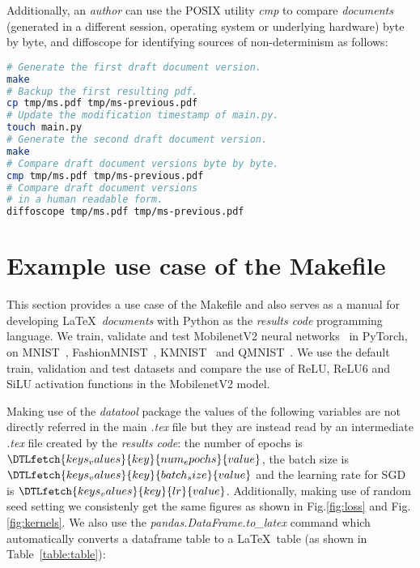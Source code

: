 \documentclass[journal]{IEEEtran}
\begin{document}
Additionally, an \textit{author} can use the POSIX utility \textit{cmp} to compare \textit{documents} (generated in a different session, operating system or underlying hardware) byte by byte, and diffoscope for identifying sources of non-determinism as follows:
\begin{lstlisting}[language=bash, style=lststyle, caption={Test draft document version reproducibility. This can also be used as a test script when pushing or pull requesting to a remote repository.}]
# Generate the first draft document version.
make
# Backup the first resulting pdf.
cp tmp/ms.pdf tmp/ms-previous.pdf
# Update the modification timestamp of main.py.
touch main.py
# Generate the second draft document version.
make
# Compare draft document versions byte by byte.
cmp tmp/ms.pdf tmp/ms-previous.pdf
# Compare draft document versions
# in a human readable form.
diffoscope tmp/ms.pdf tmp/ms-previous.pdf
\end{lstlisting}

\section{Example use case of the Makefile}
This section provides a use case of the Makefile and also serves as a manual for developing \LaTeX\ \textit{documents} with Python as the \textit{results code} programming language.
We train, validate and test MobilenetV2 neural networks~\cite{sandler2018mobilenetv2} in PyTorch, on MNIST~\cite{lecun2010mnist}, FashionMNIST~\cite{xiao2017fashion}, KMNIST~\cite{clanuwat2018deep} and QMNIST~\cite{yadav2019cold}.
We use the default train, validation and test datasets and compare the use of ReLU, ReLU6\cite{dahl2013improving} and SiLU\cite{elfwing2018sigmoid} activation functions in the MobilenetV2 model.

Making use of the \textit{datatool} package the values of the following variables are not directly referred in the main \textit{.tex} file but they are instead read by an intermediate \textit{.tex} file created by the \textit{results code}: the number of epochs is $\DTLfetch{keys_values}{key}{num_epochs}{value}$, the batch size is $\DTLfetch{keys_values}{key}{batch_size}{value}$ and the learning rate for SGD is $\DTLfetch{keys_values}{key}{lr}{value}$.
Additionally, making use of random seed setting we consistenly get the same figures as shown in Fig.\ref{fig:loss} and Fig.\ref{fig:kernels}.
We also use the \textit{pandas.DataFrame.to\_latex} command which automatically converts a dataframe table to a \LaTeX\ table (as shown in Table~\ref{table:table}):
\end{document}
